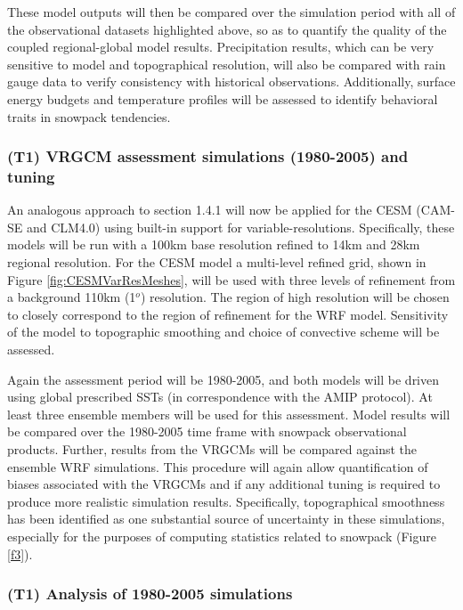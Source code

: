 \documentclass[11pt]{article}
\begin{document}
These model outputs will then be compared over the simulation period with all of the observational datasets highlighted above, so as to quantify the quality of the coupled regional-global model results. Precipitation results, which can be very sensitive to model and topographical resolution, will also be compared with rain gauge data to verify consistency with historical observations.  Additionally, surface energy budgets and temperature profiles will be assessed to identify behavioral traits in snowpack tendencies.



\subsubsection{(T1) VRGCM assessment simulations (1980-2005) and tuning}

An analogous approach to section 1.4.1 will now be applied  for  the  CESM  (CAM-SE and CLM4.0) using built-in support for variable-resolutions.  Specifically, these models will be run with a 100km base resolution refined to 14km and 28km regional resolution. For the CESM model a multi-level refined grid, shown in Figure \ref{fig:CESMVarResMeshes}, will be used with three levels of refinement from a background 110km (1$^{o}$) resolution. The region of high resolution will be chosen to closely correspond to the region of refinement for the WRF model.  Sensitivity of the model to topographic smoothing and choice of convective scheme will be assessed.  %

Again the assessment period will be 1980-2005, and both models will be driven using global prescribed SSTs (in correspondence with the AMIP protocol).  At least three ensemble members will be used for this assessment. Model results will be compared over the 1980-2005 time frame with snowpack observational products. Further, results from the VRGCMs will be compared against the ensemble WRF simulations. This procedure will again allow quantification of biases associated with the VRGCMs and if any additional tuning is required to produce more realistic simulation results.  Specifically, topographical smoothness has been identified as one substantial source of uncertainty in these simulations, especially for the purposes of computing statistics related to snowpack (Figure \ref{f3}).

\subsubsection{(T1) Analysis of 1980-2005 simulations}
\end{document}
